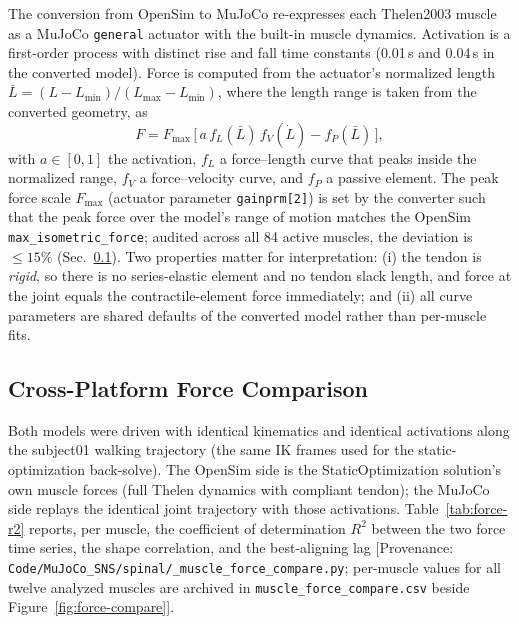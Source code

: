 The conversion from OpenSim to MuJoCo re-expresses each Thelen2003
muscle as a MuJoCo \texttt{general} actuator with the built-in muscle
dynamics. Activation is a first-order process with distinct rise and
fall time constants (0.01\,s and 0.04\,s in the converted model). Force
is computed from the actuator's normalized length
$\bar{L} = (L - L_{\min}) / (L_{\max} - L_{\min})$, where the length
range is taken from the converted geometry, as
\begin{equation}
  F = F_{\max}\,\bigl[\,a\, f_L(\bar{L})\, f_V(\dot{L}) - f_P(\bar{L})\,\bigr],
  \label{eq:mj-muscle}
\end{equation}
with $a \in [0,1]$ the activation, $f_L$ a force--length curve that
peaks inside the normalized range, $f_V$ a force--velocity curve, and
$f_P$ a passive element. The peak force scale $F_{\max}$ (actuator
parameter \texttt{gainprm[2]}) is set by the converter such that the
peak force over the model's range of motion matches the OpenSim
\texttt{max\_isometric\_force}; audited across all 84 active muscles,
the deviation is $\le 15\%$ (Sec.~\ref{sec:muscle-models-compare}). Two
properties matter for interpretation: (i) the tendon is \emph{rigid},
so there is no series-elastic element and no tendon slack length, and
force at the joint equals the contractile-element force immediately;
and (ii) all curve parameters are shared defaults of the converted
model rather than per-muscle fits.

\subsection{Cross-Platform Force Comparison}
\label{sec:muscle-models-compare}

Both models were driven with identical kinematics and identical
activations along the subject01 walking trajectory (the same IK frames
used for the static-optimization back-solve). The OpenSim side is the
StaticOptimization solution's own muscle forces (full Thelen dynamics
with compliant tendon); the MuJoCo side replays the identical joint
trajectory with those activations. Table~\ref{tab:force-r2} reports, per
muscle, the coefficient of determination $R^2$ between the two force
time series, the shape correlation, and the best-aligning lag
[Provenance: \texttt{Code/MuJoCo\_SNS/spinal/\_muscle\_force\_compare.py};
per-muscle values for all twelve analyzed muscles are archived in
\texttt{muscle\_force\_compare.csv} beside Figure~\ref{fig:force-compare}].

